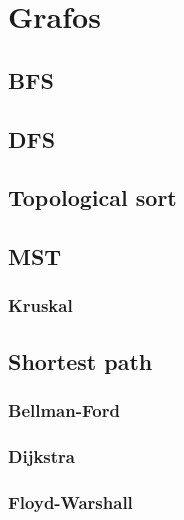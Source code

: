 \section{Grafos}

\subsection{BFS}


\subsection{DFS}


\subsection{Topological sort}


\subsection{MST}

\subsubsection{Kruskal}


\subsection{Shortest path}

\subsubsection{Bellman-Ford}


\subsubsection{Dijkstra}


\subsubsection{Floyd-Warshall}


